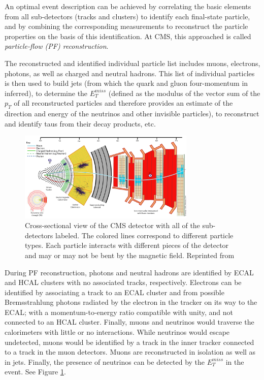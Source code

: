 An optimal event description can be achieved by correlating the basic elements from all sub-detectors (tracks and clusters) to identify each final-state particle, and by combining the corresponding measurements to reconstruct the particle properties on the basis of this identification. At CMS, this approached is called \textit{particle-flow (PF) reconstruction}.

The reconstructed and identified individual particle list includes muons, electrons, photons, as well as charged  and neutral hadrons. This list of individual particles is then used to build jets (from which the quark and gluon four-momentum in inferred), to determine the $E_{T}^{miss}$ (defined as the modulus of the vector sum of the $p_{T}$ of all reconstructed particles and therefore provides an estimate of the direction and energy of the neutrinos and other invisible particles), to reconstruct and identify taus from their decay products, etc.

 \begin{figure}[h]
 	\centering
 	\includegraphics[width=0.75\textwidth]{figures/image005.png}
 	\singlespace
 	\caption{Cross-sectional view of the CMS detector with all of the sub-detectors labeled. The colored lines correspond to different particle types. Each particle interacts with different pieces of the detector and may or may not be bent by the magnetic field. Reprinted from \cite{CMSSlice}}
  	\label{fig:cmsslice} 	
 \end{figure}

During PF reconstruction, photons and neutral hadrons are identified by ECAL and HCAL clusters with no associated tracks, respectively. Electrons can be identified by associating a track to an ECAL cluster and from possible Bremsstrahlung photons radiated by the electron in the tracker on its way to the ECAL; with a momentum-to-energy ratio compatible with unity, and not connected to an HCAL cluster. Finally, muons and neutrinos would traverse the calorimeters with little or no interactions. While neutrinos would escape undetected, muons would be identified by a track in the inner tracker connected to a track in the muon detectors. Muons are reconstructed in isolation as well as in jets. Finally, the presence of neutrinos can be detected by the $E_{T}^{miss}$ in the event. See Figure \ref{fig:cmsslice}.

